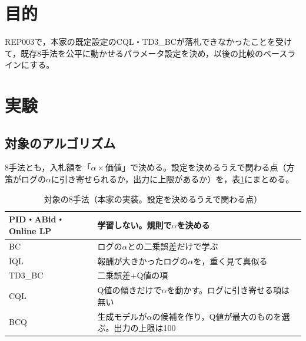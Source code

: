 \documentclass[twocolumn, 10pt]{ujarticle}
\begin{document}
\beginverification

\section{目的}\label{sec:e-purpose}

REP003で，本家の既定設定のCQL・TD3\_BCが落札できなかったことを受けて，既存8手法を公平に動かせるパラメータ設定を決め，以後の比較のベースラインにする。

\section{実験}\label{sec:e-exp}

\subsection{対象のアルゴリズム}\label{sec:e-algo}

8手法とも，入札額を「$\alpha\times$価値」で決める。設定を決めるうえで関わる点（方策がログの$\alpha$に引き寄せられるか，出力に上限があるか）を，表\ref{tab:algo}にまとめる。

\begin{table}[H]
\centering
\caption{対象の8手法（本家の実装。設定を決めるうえで関わる点）}
\label{tab:algo}
\footnotesize
\begin{tabularx}{\linewidth}{@{}l>{\raggedright\arraybackslash}X@{}}
\toprule
PID・ABid・Online LP & 学習しない。規則で$\alpha$を決める \\
\midrule
BC & ログの$\alpha$との二乗誤差だけで学ぶ \\
IQL & 報酬が大きかったログの$\alpha$を，重く見て真似る \\
TD3\_BC & 二乗誤差$+$Q値の項 \\
CQL & Q値の傾きだけで$\alpha$を動かす。ログに引き寄せる項は無い \\
BCQ & 生成モデルが$\alpha$の候補を作り，Q値が最大のものを選ぶ。出力の上限は100 \\
\bottomrule
\end{tabularx}
\end{table}
\end{document}
